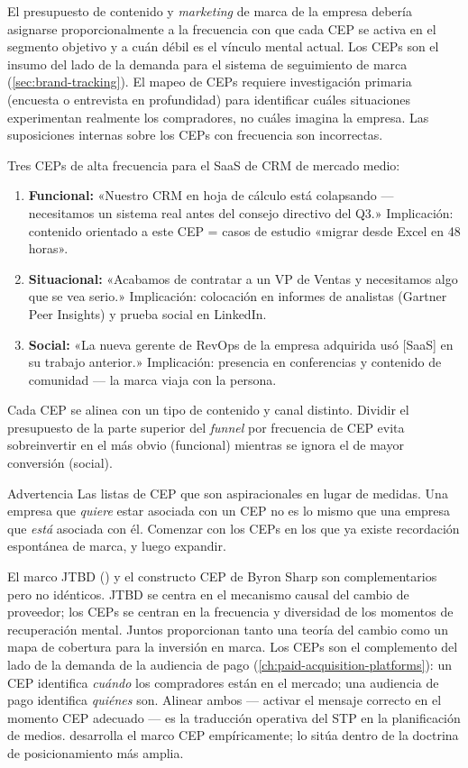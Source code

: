 El presupuesto de contenido y \emph{marketing} de marca de la empresa debería asignarse proporcionalmente a la frecuencia con que cada CEP se activa en el segmento objetivo y a cuán débil es el vínculo mental actual. Los CEPs son el insumo del lado de la demanda para el sistema de seguimiento de marca (\cref{sec:brand-tracking}). El mapeo de CEPs requiere investigación primaria (encuesta o entrevista en profundidad) para identificar cuáles situaciones experimentan realmente los compradores, no cuáles imagina la empresa. Las suposiciones internas sobre los CEPs con frecuencia son incorrectas.

\begin{example}
Tres CEPs de alta frecuencia para el SaaS de CRM de mercado medio:
\begin{enumerate}
  \item \textbf{Funcional:} «Nuestro CRM en hoja de cálculo está colapsando --- necesitamos un sistema real antes del consejo directivo del Q3.» Implicación: contenido orientado a este CEP = casos de estudio «migrar desde Excel en 48 horas».
  \item \textbf{Situacional:} «Acabamos de contratar a un VP de Ventas y necesitamos algo que se vea serio.» Implicación: colocación en informes de analistas (Gartner Peer Insights) y prueba social en LinkedIn.
  \item \textbf{Social:} «La nueva gerente de RevOps de la empresa adquirida usó [SaaS] en su trabajo anterior.» Implicación: presencia en conferencias y contenido de comunidad --- la marca viaja con la persona.
\end{enumerate}
Cada CEP se alinea con un tipo de contenido y canal distinto. Dividir el presupuesto de la parte superior del \emph{funnel} por frecuencia de CEP evita sobreinvertir en el más obvio (funcional) mientras se ignora el de mayor conversión (social).
\end{example}

\begin{admonition}{Advertencia}
Las listas de CEP que son aspiracionales en lugar de medidas. Una empresa que \emph{quiere} estar asociada con un CEP no es lo mismo que una empresa que \emph{está} asociada con él. Comenzar con los CEPs en los que ya existe recordación espontánea de marca, y luego expandir.
\end{admonition}

El marco JTBD (\textcite{christensen1997}) y el constructo CEP de Byron Sharp son complementarios pero no idénticos. JTBD se centra en el mecanismo causal del cambio de proveedor; los CEPs se centran en la frecuencia y diversidad de los momentos de recuperación mental. Juntos proporcionan tanto una teoría del cambio como un mapa de cobertura para la inversión en marca. Los CEPs son el complemento del lado de la demanda de la audiencia de pago (\cref{ch:paid-acquisition-platforms}): un CEP identifica \emph{cuándo} los compradores están en el mercado; una audiencia de pago identifica \emph{quiénes} son. Alinear ambos --- activar el mensaje correcto en el momento CEP adecuado --- es la traducción operativa del STP en la planificación de medios. \textcite{sharp2010} desarrolla el marco CEP empíricamente; \textcite{kotler2021} lo sitúa dentro de la doctrina de posicionamiento más amplia.
